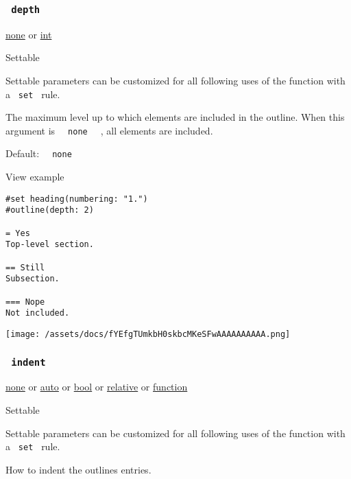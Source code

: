 \subsubsection{\texorpdfstring{\texttt{\ depth\ }}{ depth }}\label{parameters-depth}

\href{/docs/reference/foundations/none/}{none} {or}
\href{/docs/reference/foundations/int/}{int}

{{ Settable }}

\label{parameters-depth-settable-tooltip}
Settable parameters can be customized for all following uses of the
function with a \texttt{\ set\ } rule.

The maximum level up to which elements are included in the outline. When
this argument is \texttt{\ }{\texttt{\ none\ }}\texttt{\ } , all
elements are included.

Default: \texttt{\ }{\texttt{\ none\ }}\texttt{\ }


View example

\begin{verbatim}
#set heading(numbering: "1.")
#outline(depth: 2)

= Yes
Top-level section.

== Still
Subsection.

=== Nope
Not included.
\end{verbatim}

\texttt{[image: /assets/docs/fYEfgTUmkbH0skbcMKeSFwAAAAAAAAAA.png]}

\subsubsection{\texorpdfstring{\texttt{\ indent\ }}{ indent }}\label{parameters-indent}

\href{/docs/reference/foundations/none/}{none} {or}
\href{/docs/reference/foundations/auto/}{auto} {or}
\href{/docs/reference/foundations/bool/}{bool} {or}
\href{/docs/reference/layout/relative/}{relative} {or}
\href{/docs/reference/foundations/function/}{function}

{{ Settable }}

\label{parameters-indent-settable-tooltip}
Settable parameters can be customized for all following uses of the
function with a \texttt{\ set\ } rule.

How to indent the outline\textquotesingle s entries.

